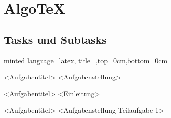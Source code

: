 \documentclass[
    ngerman,
    accentcolor=3b,
    dark_mode,
    fontsize= 12pt,
    a4paper,
    aspectratio=169,
    colorback=true,
    fancy_row_colors,
    leqno,
    fleqn,
    boxarc=3pt,
    fleqn,
]{algoslides}
\begin{document}
    \section{AlgoTeX}\label{AlgoTeX}
    \subsection{Tasks und Subtasks}
    \begin{frame}[fragile,c]
        \slidehead{}
        \vspace{-1.8em}
        \begin{codeBlock}[fontsize=\footnotesize]{minted language=latex, title=,top=0cm,bottom=0cm}
        \begin{task}[points=<n>]{<Aufgabentitel>}\label{ex:H1} %
            <Aufgabenstellung>
        \end{task}
        \begin{task}[points=auto]{<Aufgabentitel>}\label{ex:H2} %
            <Einleitung>
            \begin{subtask*}[points=<n2>]{<Aufgabentitel>}\label{ex:H2.1}
                <Aufgabenstellung Teilaufgabe 1>
            \end{subtask*}
        \end{task}
    \end{codeBlock}
    \end{frame}
\end{document}
